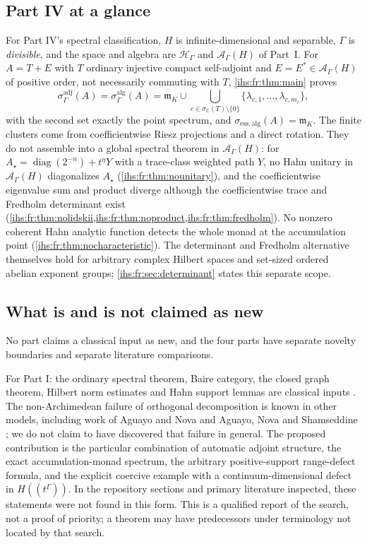 \documentclass[11pt,a4paper]{article}
\numberwithin{equation}{section}
\theoremstyle{definition}
\theoremstyle{remark}
\newcommand{\C}{\mathbb C}
\newcommand{\mK}{\mathfrak m_K}
\newcommand{\Hil}{\mathcal H_\Gamma}
\newcommand{\Ahh}{\mathcal A_\Gamma(H)}
\newcommand{\diag}{\operatorname{diag}}
\begin{document}
\subsection{Part IV at a glance}\label{ihs:sec:glancefour}
For Part IV's spectral classification, $H$ is infinite-dimensional and separable, $\Gamma$ is
\emph{divisible}, and the space and algebra are $\Hil$ and $\Ahh$ of Part~I.
For $A=T+E$ with $T$ ordinary injective compact self-adjoint and
$E=E^*\in\Ahh$ of positive order, not necessarily commuting with $T$,
\cref{ihs:fr:thm:main} proves
\[
 \sigma^{\mathrm{adj}}_\Gamma(A)=\sigma^{\mathrm{alg}}_\Gamma(A)=\mK\cup
 \bigcup_{c\in\sigma_\C(T)\setminus\{0\}}\{\lambda_{c,1},\ldots,\lambda_{c,m_c}\},
\]
with the second set exactly the point spectrum, and
$\sigma_{\mathrm{ess,alg}}(A)=\mK$. The finite clusters come from
coefficientwise Riesz projections and a direct rotation. They do not
assemble into a global spectral theorem in $\Ahh$: for
$A_\star=\diag(2^{-n})+t^\eta Y$ with a trace-class weighted path $Y$, no
Hahn unitary in $\Ahh$ diagonalizes $A_\star$ (\cref{ihs:fr:thm:nounitary}),
and the coefficientwise eigenvalue sum and product diverge although the
coefficientwise trace and Fredholm determinant exist
(\cref{ihs:fr:thm:nolidskii,ihs:fr:thm:noproduct,ihs:fr:thm:fredholm}). No
nonzero coherent Hahn analytic function detects the whole monad at the
accumulation point (\cref{ihs:fr:thm:nocharacteristic}).
The determinant and Fredholm alternative themselves hold for arbitrary
complex Hilbert spaces and set-sized ordered abelian exponent groups;
\cref{ihs:fr:sec:determinant} states this separate scope.

\subsection{What is and is not claimed as new}\label{ihs:sec:novelty}
No part claims a classical input as new, and the four parts have separate
novelty boundaries and separate literature comparisons.

For Part I: the ordinary spectral theorem, Baire category, the closed graph
theorem, Hilbert norm estimates and Hahn support lemmas are classical inputs
\cite{Douglas,Neumann}. The non-Archimedean failure of orthogonal
decomposition is known in other models, including work of Aguayo and Nova
\cite{AN} and Aguayo, Nova and Shamseddine \cite{ANS}; we do not claim to
have discovered that failure in general. The proposed contribution is the
particular combination of automatic adjoint structure, the exact
accumulation-monad spectrum, the arbitrary positive-support range-defect
formula, and the explicit coercive example with a continuum-dimensional
defect in $H((t^\Gamma))$. In the repository sections and primary literature
inspected, these statements were not found in this form. This is a qualified
report of the search, not a proof of priority; a theorem may have
predecessors under terminology not located by that search.
\end{document}
